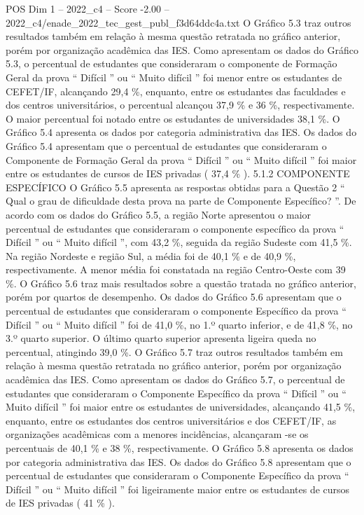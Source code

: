 \begin{textsample}{POS Dim 1 – 2022\_c4 – Score -2.00 – 2022\_c4/enade\_2022\_tec\_gest\_publ\_f3d64ddc4a.txt}
O Gráfico 5.3 traz outros resultados também em relação à mesma questão retratada no gráfico anterior, porém por organização acadêmica das IES.
Como apresentam os dados do Gráfico 5.3, o percentual de estudantes que consideraram o componente de Formação Geral da prova “ Difícil ” ou “ Muito difícil ” foi menor entre os estudantes de CEFET/IF, alcançando 29,4 \%, enquanto, entre os estudantes das faculdades e dos centros universitários, o percentual alcançou 37,9 \% e 36 \%, respectivamente.
O maior percentual foi notado entre os estudantes de universidades 38,1 \%.
O Gráfico 5.4 apresenta os dados por categoria administrativa das IES.
Os dados do Gráfico 5.4 apresentam que o percentual de estudantes que consideraram o Componente de Formação Geral da prova “ Difícil ” ou “ Muito difícil ” foi maior entre os estudantes de cursos de IES privadas ( 37,4 \% ). 5.1.2 COMPONENTE ESPECÍFICO O Gráfico 5.5 apresenta as respostas obtidas para a Questão 2 “ Qual o grau de dificuldade desta prova na parte de Componente Específico? ”.
De acordo com os dados do Gráfico 5.5, a região Norte apresentou o maior percentual de estudantes que consideraram o componente específico da prova “ Difícil ” ou “ Muito difícil ”, com 43,2 \%, seguida da região Sudeste com 41,5 \%.
Na região Nordeste e região Sul, a média foi de 40,1 \% e de 40,9 \%, respectivamente.
A menor média foi constatada na região Centro-Oeste com 39 \%.
O Gráfico 5.6 traz mais resultados sobre a questão tratada no gráfico anterior, porém por quartos de desempenho.
Os dados do Gráfico 5.6 apresentam que o percentual de estudantes que consideraram o componente Específico da prova “ Difícil ” ou “ Muito difícil ” foi de 41,0 \%, no 1.º quarto inferior, e de 41,8 \%, no 3.º quarto superior.
O último quarto superior apresenta ligeira queda no percentual, atingindo 39,0 \%.
O Gráfico 5.7 traz outros resultados também em relação à mesma questão retratada no gráfico anterior, porém por organização acadêmica das IES.
Como apresentam os dados do Gráfico 5.7, o percentual de estudantes que consideraram o Componente Específico da prova “ Difícil ” ou “ Muito difícil ” foi maior entre os estudantes de universidades, alcançando 41,5 \%, enquanto, entre os estudantes dos centros universitários e dos CEFET/IF, as organizações acadêmicas com a menores incidências, alcançaram -se os percentuais de 40,1 \% e 38 \%, respectivamente.
O Gráfico 5.8 apresenta os dados por categoria administrativa das IES.
Os dados do Gráfico 5.8 apresentam que o percentual de estudantes que consideraram o Componente Específico da prova “ Difícil ” ou “ Muito difícil ” foi ligeiramente maior entre os estudantes de cursos de IES privadas ( 41 \% ).

\end{textsample}
